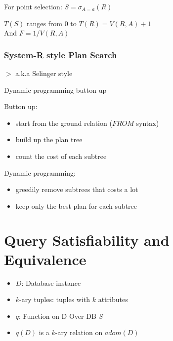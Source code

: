 \documentclass[12pt,a4paper]{article}
\newcommand{\remark}[1]{
    $>$ {\color{blue} #1}
}
\begin{document}
For point selection: $S = \sigma_{A=a}(R)$

$T(S)$ ranges from 0 to $T(R) = V(R,A) + 1$ \\
And $F = 1/V(R,A)$

\subsubsection*{System-R style Plan Search}

\remark{a.k.a Selinger style}

Dynamic programming button up

Button up:

\begin{itemize}
    \item start from the ground relation ($FROM$ syntax)
    \item build up the plan tree
    \item count the cost of each subtree
\end{itemize}

Dynamic programming:

\begin{itemize}
    \item greedily remove subtrees that costs a lot
    \item keep only the best plan for each subtree
\end{itemize}

\section*{Query Satisfiability and Equivalence}

\begin{center}
\end{center}

\begin{itemize}
    \item $D$: Database instance
    \item $k$-ary tuples: tuples with $k$ attributes
    \item $q$: Function on D Over DB $S$
    \item \(q(D)\) is a $k$-ary relation on \(adom(D)\)
\end{itemize}
\end{document}
